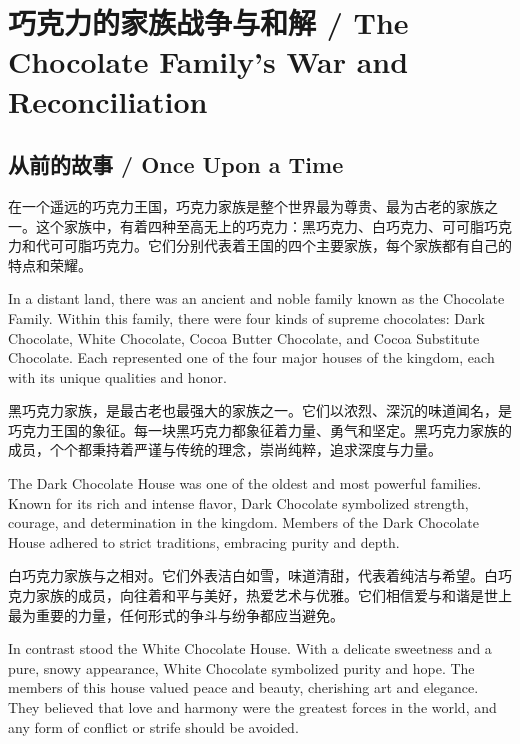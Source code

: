 \chapter*{巧克力的家族战争与和解 / The Chocolate Family’s War and Reconciliation}


\section*{从前的故事 / Once Upon a Time}
在一个遥远的巧克力王国，巧克力家族是整个世界最为尊贵、最为古老的家族之一。这个家族中，有着四种至高无上的巧克力：黑巧克力、白巧克力、可可脂巧克力和代可可脂巧克力。它们分别代表着王国的四个主要家族，每个家族都有自己的特点和荣耀。

\begin{flushright} In a distant land, there was an ancient and noble family known as the Chocolate Family. Within this family, there were four kinds of supreme chocolates: Dark Chocolate, White Chocolate, Cocoa Butter Chocolate, and Cocoa Substitute Chocolate. Each represented one of the four major houses of the kingdom, each with its unique qualities and honor. \end{flushright}

黑巧克力家族，是最古老也最强大的家族之一。它们以浓烈、深沉的味道闻名，是巧克力王国的象征。每一块黑巧克力都象征着力量、勇气和坚定。黑巧克力家族的成员，个个都秉持着严谨与传统的理念，崇尚纯粹，追求深度与力量。

\begin{flushright} The Dark Chocolate House was one of the oldest and most powerful families. Known for its rich and intense flavor, Dark Chocolate symbolized strength, courage, and determination in the kingdom. Members of the Dark Chocolate House adhered to strict traditions, embracing purity and depth. \end{flushright}

白巧克力家族与之相对。它们外表洁白如雪，味道清甜，代表着纯洁与希望。白巧克力家族的成员，向往着和平与美好，热爱艺术与优雅。它们相信爱与和谐是世上最为重要的力量，任何形式的争斗与纷争都应当避免。

\begin{flushright} In contrast stood the White Chocolate House. With a delicate sweetness and a pure, snowy appearance, White Chocolate symbolized purity and hope. The members of this house valued peace and beauty, cherishing art and elegance. They believed that love and harmony were the greatest forces in the world, and any form of conflict or strife should be avoided. \end{flushright}

